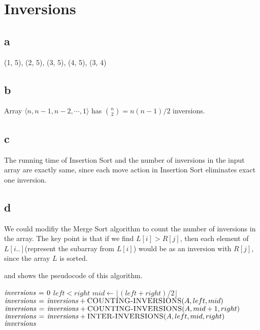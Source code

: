 \section{Inversions}

\subsection{a}

(1, 5), (2, 5), (3, 5), (4, 5), (3, 4)


\subsection{b}

Array $\langle n, n - 1, n - 2, \cdots, 1 \rangle$ has $\binom{n}{2} = n(n - 1) / 2$ inversions.


\subsection{c}

The running time of Insertion Sort and the number of inversions in the input array are exactly same, since each move action in Insertion Sort eliminates exact one inversion.


\subsection{d}

We could modifiy the Merge Sort algorithm to count the number of inversions in the array.
The key point is that if we find $L[i] > R[j]$, then each element of $L[i..]$(represent the subarray from $L[i]$) would be as an inversion with $R[j]$, since the array $L$ is sorted.

 and  shows the pseudocode of this algorithm.

\begin{codebox}
\li	$\id{inversions} \gets 0$
\li	\If $left < right$
\li	\Then
		$mid \gets \lfloor (left + right) / 2 \rfloor$
\li		$\id{inversions} \gets \id{inversions} + \proc{COUNTING-INVERSIONS}(A, left, mid)$
\li		$\id{inversions} \gets \id{inversions} + \proc{COUNTING-INVERSIONS}(A, mid + 1, right)$
\li		$\id{inversions} \gets \id{inversions} + \proc{INTER-INVERSIONS}(A, left, mid, right)$
	\End
\li	\Return $\id{inversions}$
\end{codebox}


